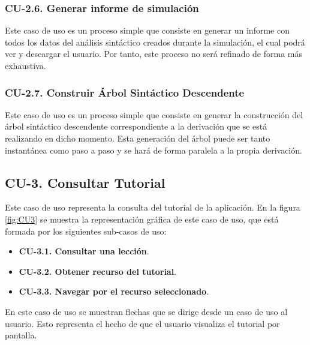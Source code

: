 \subsubsection{CU-2.6. Generar informe de simulación}

 Este caso de uso es un proceso simple que consiste en generar un informe con todos los datos del análisis sintáctico creados durante la simulación, el cual podrá ver y descargar el usuario. Por tanto, este proceso no será refinado de forma más exhaustiva.

 \subsubsection{CU-2.7. Construir Árbol Sintáctico Descendente}

 Este caso de uso es un proceso simple que consiste en generar la construcción del árbol sintáctico descendente correspondiente a la derivación que se está realizando en dicho momento. Esta generación del árbol puede ser tanto instantánea como paso a paso y se hará de forma paralela a la propia derivación.


 \subsection{CU-3. Consultar Tutorial}

 Este caso de uso representa la consulta del tutorial de la aplicación. En la figura \ref{fig:CU3} se muestra la representación gráfica de este caso de uso, que está formada por los siguientes sub-casos de uso:

 \begin{itemize}
  \item \textbf{CU-3.1. Consultar una lección}.
  \item \textbf{CU-3.2. Obtener recurso del tutorial}.
  \item \textbf{CU-3.3. Navegar por el recurso seleccionado}.

 \end{itemize}

 En este caso de uso se muestran flechas que se dirige desde un caso de uso al usuario. Esto representa el hecho de que el usuario visualiza el tutorial por pantalla.

